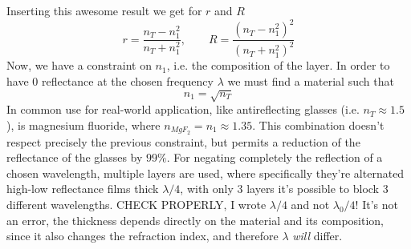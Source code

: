 \documentclass[../electromagnetism.tex]{subfiles}
\begin{document}
Inserting this awesome result we get for $r$ and $R$
\begin{equation}
	r=\frac{n_T-n_1^2}{n_T+n_1^2}, \qquad R=\frac{\left( n_T-n_1^2 \right)^2}{\left( n_T+n_1^2 \right)^2}
	\label{eq:coolres.arc}
\end{equation}
Now, we have a constraint on $n_1$, i.e. the composition of the layer. In order to have $0$ reflectance at the chosen frequency $\lambda$ we must find a material such that
\begin{equation}
	n_1=\sqrt{n_T}
	\label{eq:materialconstraint.arc}
\end{equation}
In common use for real-world application, like antireflecting glasses (i.e. $n_T\approx1.5$), is magnesium fluoride, where $n_{MgF_2}=n_1\approx1.35$. This combination doesn't respect precisely the previous constraint, but permits a reduction of the reflectance of the glasses by $99\%$. For negating completely the reflection of a chosen wavelength, multiple layers are used, where specifically they're alternated high-low reflectance films thick $\lambda/4$, with only 3 layers it's possible to block 3 different wavelengths. CHECK PROPERLY, I wrote $\lambda/4$ and not $\lambda_0/4$! It's not an error, the thickness depends directly on the material and its composition, since it also changes the refraction index, and therefore $\lambda$ \textit{will} differ.
\end{document}

